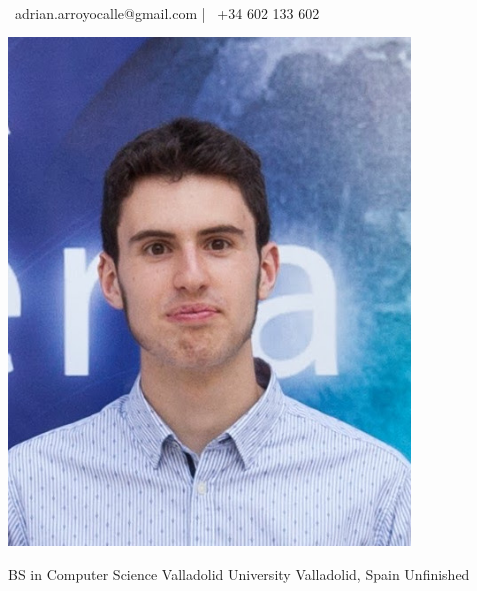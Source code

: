\documentclass[]{awesome-cv}
\begin{document}
\begin{minipage}[b]{0.66666\textwidth}
\begin{center}
	  \\
	\vspace{2mm}
	{\faEnvelope\ adrian.arroyocalle@gmail.com} | {\faMobile\ +34 602 133 602}  
\end{center}
\end{minipage}
\begin{minipage}[b]{0.33333\textwidth}
	\includegraphics[width=0.8\textwidth]{adrian}
\end{minipage}

\begin{cventries}
	\cventry
	{BS in Computer Science}
	{Valladolid University}
	{Valladolid, Spain}
	{Unfinished}
	{}
\end{cventries}
\end{document}
